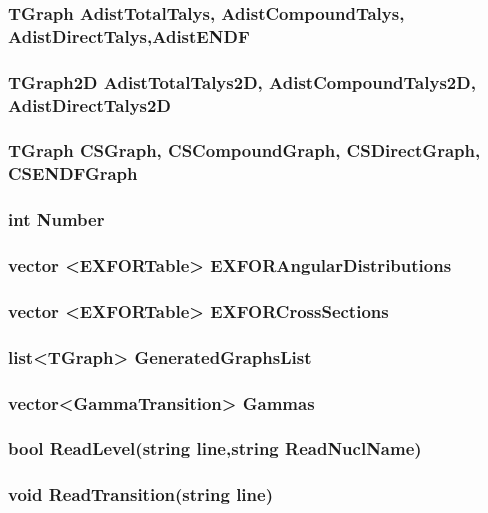 \documentclass[a4paper,12pt]{extarticle}
\begin{document}
\subsubsection{TGraph AdistTotalTalys, AdistCompoundTalys, AdistDirectTalys,AdistENDF}

\subsubsection{TGraph2D AdistTotalTalys2D, AdistCompoundTalys2D, AdistDirectTalys2D}

\subsubsection{TGraph CSGraph, CSCompoundGraph, CSDirectGraph, CSENDFGraph}

\subsubsection{int Number}

\subsubsection{vector <EXFORTable> EXFORAngularDistributions}

\subsubsection{vector <EXFORTable> EXFORCrossSections}

\subsubsection{list<TGraph> GeneratedGraphsList}

\subsubsection{vector<GammaTransition> Gammas}

\subsubsection{bool ReadLevel(string line,string ReadNuclName)}

\subsubsection{void ReadTransition(string line)}
\end{document}
